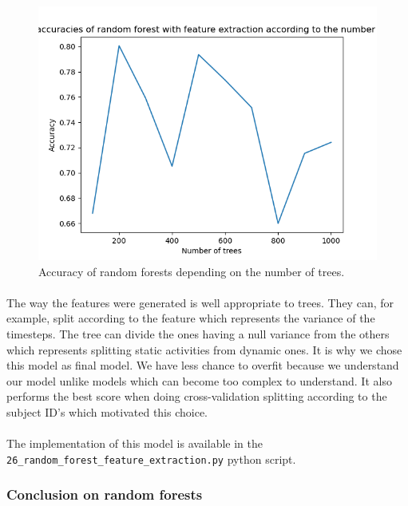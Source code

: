 \documentclass[a4paper, 11pt, oneside]{article}
\begin{document}
\begin{figure}[H]
\centering
\includegraphics[scale=0.4]{rf/random_forest_feature_extraction.png}
\caption{Accuracy of random forests depending on the number of trees.}
\label{fig:rf-feature-extraction}
\end{figure}

\paragraph{}The way the features were generated is well appropriate to trees. They can, for example, split according to the feature which represents the variance of the timesteps. The tree can divide the ones having a null variance from the others which represents splitting static activities from dynamic ones. It is why we chose this model as final model. We have less chance to overfit because we understand our model unlike models which can become too complex to understand. It also performs the best score when doing cross-validation splitting according to the subject ID's which motivated this choice.

\paragraph{}The implementation of this model is available in the \texttt{26\_random\_forest\_feature\_extraction.py} python script.

\subsubsection{Conclusion on random forests}
\end{document}
